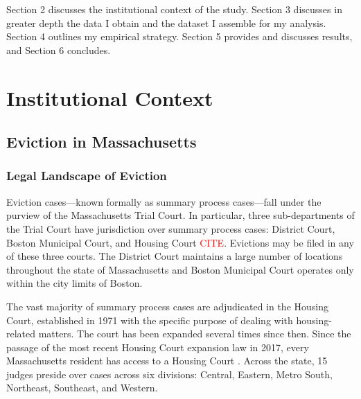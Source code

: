 \documentclass[12pt]{article}
\begin{document}
Section 2 discusses the institutional context of the study. Section 3 discusses in greater depth the data I obtain and the dataset I assemble for my analysis. Section 4 outlines my empirical strategy. Section 5 provides and discusses results, and Section 6 concludes.



\section{Institutional Context}
    \subsection{Eviction in Massachusetts}
        \subsubsection{Legal Landscape of Eviction}
        Eviction cases—known formally as summary process cases—fall under the purview of the Massachusetts Trial Court. In particular, three sub-departments of the Trial Court have jurisdiction over summary process cases: District Court, Boston Municipal Court, and Housing Court \textcolor{red}{CITE}. Evictions may be filed in any of these three courts. The District Court maintains a large number of locations throughout the state of Massachusetts and Boston Municipal Court operates only within the city limits of Boston. 

        
        The vast majority of summary process cases are adjudicated in the Housing Court, established in 1971 with the specific purpose of dealing with housing-related matters. The court has been expanded several times since then. Since the passage of the most recent Housing Court expansion law in 2017, every Massachusetts resident has access to a Housing Court \citep{gee_housing_2017}. Across the state, 15 judges preside over cases across six divisions: Central, Eastern, Metro South, Northeast, Southeast, and Western. 
\end{document}
